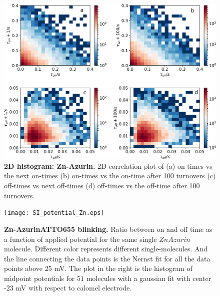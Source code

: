 \begin{figure}
  \centering
  \includegraphics[width=\textwidth,keepaspectratio]{Figure_SI/SI_on_off_2D_histogram_Zn.png}
	\makeatletter
	\renewcommand{\fnum@figure}{\figurename~S\thefigure}
	\makeatother
  \caption{\textbf{2D histogram: Zn-Azurin.} 2D correlation plot of (a) on-times vs the next on-times (b) on-times vs the on-time after 100 turnovers (c) off-times vs next off-times (d) off-times vs the off-time after 100 turnovers.}
  \label{SIfig:tracecomparision}
\end{figure}

\begin{figure}
  \centering
  \texttt{[image: SI\_potential\_Zn.eps]}
	\makeatletter
	\renewcommand{\fnum@figure}{\figurename~S\thefigure}
	\makeatother
  \caption{\textbf{Zn-AzurinATTO655 blinking.} Ratio between on and off time as a function of applied potential for the same single $ZnAzurin$ molecule. Different color represents different single-molecules. And the line connecting the data points is the Nernst fit for all the data points above 25 mV. The plot in the right is the histogram of midpoint potentials for $51$ molecules with a gaussian fit with center -23 mV with respect to calomel electrode.}
  \label{SIfig:2Dhist_Zn}
\end{figure}